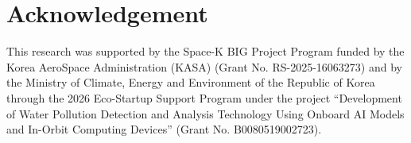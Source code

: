 \documentclass[a4paper,fleqn]{cas-dc}
\begin{document}
\section*{Acknowledgement}
This research was supported by the Space-K BIG Project Program funded by the Korea AeroSpace Administration (KASA) (Grant No. RS-2025-16063273) and by the Ministry of Climate, Energy and Environment of the Republic of Korea through the 2026 Eco-Startup Support Program under the project “Development of Water Pollution Detection and Analysis Technology Using Onboard AI Models and In-Orbit Computing Devices” (Grant No. B0080519002723).




\end{document}
